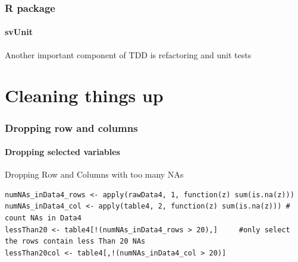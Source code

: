 \documentclass[10pt,handout,english]{beamer}\usepackage[]{graphicx}\usepackage[]{color}
\begin{document}
\begin{frame}[fragile]


\end{frame}


\begin{frame}
  \frametitle{R package}
  \framesubtitle{svUnit}
     Another important component of TDD is refactoring and unit tests
\end{frame}




\section*{Cleaning things up}
\begin{frame}[fragile]
  \frametitle{Dropping row and columns}
  \framesubtitle{Dropping selected variables}
  \begin{block}{Dropping Row and Columns with too many NAs}  
  \end{block}
\begin{lstlisting}
numNAs_inData4_rows <- apply(rawData4, 1, function(z) sum(is.na(z))) 
numNAs_inData4_col <- apply(table4, 2, function(z) sum(is.na(z))) # count NAs in Data4
lessThan20 <- table4[!(numNAs_inData4_rows > 20),]	   #only select the rows contain less Than 20 NAs
lessThan20col <- table4[,!(numNAs_inData4_col > 20)]
\end{lstlisting}
\end{frame}
\end{document}
